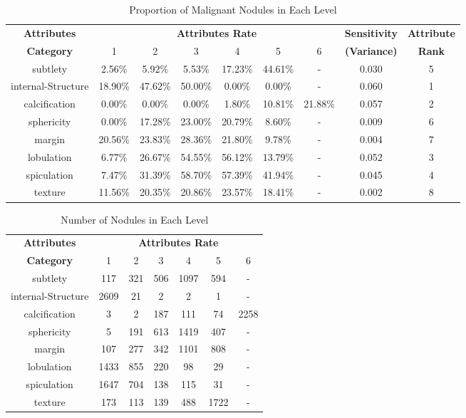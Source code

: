 \documentclass[runningheads]{llncs}
\begin{document}
\begin{table}[htb]
\caption{Proportion of Malignant Nodules in Each Level}
\vspace{-0.5cm}
\begin{center}
\begin{tabular}{|c|c|c|c|c|c|c|c|c|}
\hline
\textbf{Attributes}&\multicolumn{6}{|c|}{\textbf{Attributes Rate}} & \textbf{Sensitivity}&\textbf{Attribute}\\
\cline{2-7}
\textbf{Category}& 1&2&3&4&5&6& \textbf{(Variance)}&\textbf{Rank} \\
\hline
subtlety& 2.56\% &5.92\% & 5.53\% & 17.23\% & 44.61\% & - & 0.030&5\\
internal-Structure& 18.90\% & 47.62\% & 50.00\% & 0.00\% & 0.00\% & - &0.060&1\\
calcification& 0.00\% &0.00\% & 0.00\% & 1.80\% & 10.81\% & 21.88\% & 0.057&2 \\
sphericity& 0.00\% & 17.28\% & 23.00\% & 20.79\% & 8.60\% & - &0.009&6\\
margin& 20.56\% & 23.83\% & 28.36\% & 21.80\% & 9.78\% & - &0.004&7\\
lobulation& 6.77\% & 26.67\% & 54.55\% & 56.12\% & 13.79\% & - &0.052&3\\
spiculation& 7.47\% & 31.39\% & 58.70\% & 57.39\% & 41.94\% & -&0.045& 4\\
texture& 11.56\% & 20.35\% & 20.86\% & 23.57\% & 18.41\% & - &0.002&8\\
\hline

\end{tabular}

\label{tab2}
\end{center}
\vspace{-0.5cm}
\end{table}

\begin{table}[htb]
\caption{Number of  Nodules in Each Level}
\begin{center}
\begin{tabular}{|c|c|c|c|c|c|c|}
\hline
\textbf{Attributes}&\multicolumn{6}{|c|}{\textbf{Attributes Rate}} \\
\cline{2-7}
\textbf{Category}& 1&2&3&4&5&6\\
\hline
subtlety&117&321&506&1097&594&-\\
internal-Structure&2609&21&2&2&1&-\\
calcification&3&2&187&111&74&2258\\
sphericity&5&191&613&1419&407& -\\
margin& 107&277&342&1101&808& - \\
lobulation&1433&855&220&98&29& - \\
spiculation&1647&704&138&115&31& - \\
texture&173&113&139&488&1722& - \\
\hline
\end{tabular}
\vspace{-0.5cm}
\label{tab3}
\end{center}

\end{table}
\end{document}

